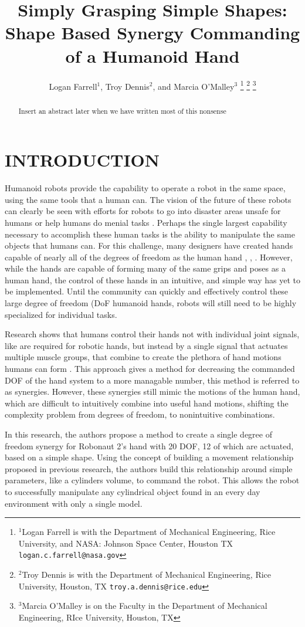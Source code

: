 \documentclass[letterpaper, 10 pt, conference]{ieeeconf}  %
\title{\LARGE \bf
Simply Grasping Simple Shapes:\\
Shape Based Synergy Commanding of a Humanoid Hand
}
\author{Logan Farrell$^{1}$, Troy Dennis$^{2}$, and Marcia O'Malley$^{3}$ %
\thanks{$^{1}$Logan Farrell is with the Department of Mechanical Engineering, Rice University, and NASA: Johnson Space Center, Houston TX
        {\tt\small logan.c.farrell@nasa.gov}}%
\thanks{$^{2}$Troy Dennis is with the Department of Mechanical Engineering, Rice University, Houston, TX
        {\tt\small troy.a.dennis@rice.edu}}%
\thanks{$^{3}$Marcia O'Malley is on the Faculty in the Department of Mechanical Engineering, RIce University, Houston, TX}
}
\begin{document}
\maketitle
\thispagestyle{empty}
\pagestyle{empty}


\begin{abstract}

Insert an abstract later when we have written most of this nonsense 

\end{abstract}


\section{INTRODUCTION}

Humanoid robots provide the capability to operate a robot in the same space, using the same tools that a human can. The vision of the future of these robots can clearly be seen with efforts for robots to go into disaster areas unsafe for humans \cite{DRC} or help humans do menial tasks \cite{missing}. Perhaps the single largest capability necessary to accomplish these human tasks is the ability to manipulate the same objects that humans can. For this challenge, many designers have created hands capable of nearly all of the degrees of freedom as the human hand \cite{r2_hand}, \cite{DRL}, \cite{missing}. However, while the hands are capable of forming many of the same grips and poses as a human hand, the control of these hands in an intuitive, and simple way has yet to be implemented. Until the community can quickly and effectively control these large degree of freedom (DoF humanoid hands, robots will still need to be highly specialized for individual tasks. \par
Research shows that humans control their hands not with individual joint signals, like are required for robotic hands, but instead by a single signal that actuates multiple muscle groups, that combine to create the plethora of hand motions humans can form \cite{Santello} \cite{neuro}. This approach gives a method for decreasing the commanded DOF of the hand system to a more managable number, this method is referred to as synergies. However, these synergies still mimic the motions of the human hand, which are difficult to intuitively combine into useful hand motions, shifting the complexity problem from degrees of freedom, to nonintuitive combinations. \par
In this research, the authors propose a method to create a single degree of freedom synergy for Robonaut 2's hand with 20 DOF, 12 of which are actuated, based on a simple shape. Using the concept of building a movement relationship proposed in previous research, the authors build this relationship around simple parameters, like a cylinders volume, to command the robot. This allows the robot to successfully manipulate any cylindrical object found in an every day environment with only a single model.  
\end{document}
